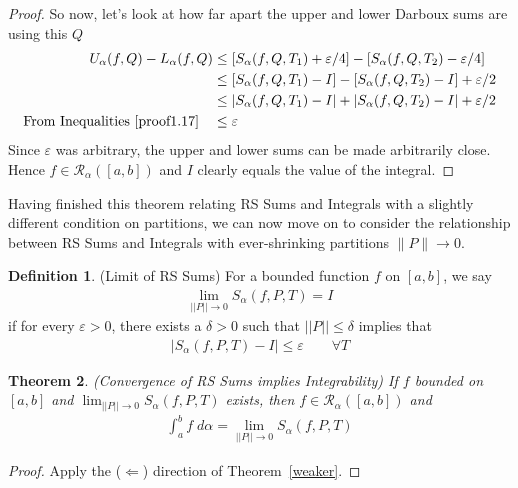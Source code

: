 \documentclass[12pt]{book}
\numberwithin{equation}{section} %
\theoremstyle{plain}
\newtheorem{thm}{Theorem}[section]
\theoremstyle{definition}
\newtheorem{defn}[thm]{Definition}
\theoremstyle{remark}
\newcommand{\ra}{\rightarrow}
\begin{document}
\begin{proof}
So now, let's look at how far apart the upper and lower Darboux sums are
using this $Q$
\begin{align*}
    U_\alpha(f,Q) - L_\alpha(f,Q) &\leq
        \left[ S_\alpha(f,Q,T_1) + \varepsilon/4\right] -
        \left[ S_\alpha(f,Q,T_2) - \varepsilon/4\right] \\
    &\leq
        \left[ S_\alpha(f,Q,T_1) - I\right] -
        \left[ S_\alpha(f,Q,T_2) - I \right]
        + \varepsilon/2
        \\
    &\leq \left\lvert S_\alpha(f,Q,T_1) - I \right\rvert+
        \left\lvert S_\alpha(f,Q,T_2) - I \right\rvert
        + \varepsilon/2 \\
    \text{From Inequalities \ref{proof1.17}} \quad
        &\leq \varepsilon
\end{align*}
Since $\varepsilon$ was arbitrary, the upper and lower sums can be made
arbitrarily close. Hence $f\in\mathscr{R}_\alpha([a,b])$ and $I$ clearly
equals the value of the integral.
\end{proof}

\clearpage
Having finished this theorem relating RS Sums and Integrals with a
slightly different condition on partitions,
we can now move on to consider the relationship between RS Sums and
Integrals with ever-shrinking partitions $\lVert P\rVert\ra0$.

\begin{defn}(Limit of RS Sums)
\label{strongest}
For a bounded function $f$ on $[a,b]$, we say
\begin{align*}
  \lim_{||P||\rightarrow 0} S_\alpha(f,P,T) = I
\end{align*}
if for every $\varepsilon>0$, there exists a $\delta>0$ such that
$||P||\leq\delta$ implies that
\begin{align*}
  |S_\alpha(f,P,T) - I | \leq \varepsilon \qquad \forall T
\end{align*}
\end{defn}

\begin{thm}\emph{(Convergence of RS Sums implies Integrability)}
\label{oneway}
If $f$ bounded on $[a,b]$ and
$\lim_{||P||\rightarrow 0}S_\alpha(f,P,T)$ exists, then
$f\in\mathscr{R}_\alpha([a,b])$ and
\begin{align}
  \int^b_a f\;d\alpha = \lim_{||P||\rightarrow 0}
    S_\alpha(f,P,T)
  \label{rssumequiv}
\end{align}
\end{thm}
\begin{proof}
Apply the ($\Leftarrow$) direction of Theorem~\ref{weaker}.
\end{proof}
\end{document}
